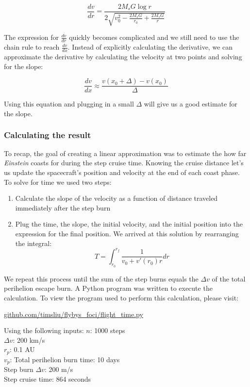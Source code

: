 \documentclass[12pt]{article} %
\begin{document}
$$\frac{dv}{dr} = \frac{2M_sG \log{r}}{2 \sqrt{v_0^2-\frac{2M_sG}{r_0} + \frac{2M_sG}{r}}}$$

The expression for $\frac{dv}{dr}$ quickly becomes complicated and we still need to use the chain rule to reach $\frac{dv}{dx}$. Instead of explicitly calculating the derivative, we can approximate the derivative by calculating the velocity at two points and solving for the slope:

$$\frac{dv}{dx} \approx \frac{v(x_0 +\Delta) - v(x_0)}{\Delta}$$

Using this equation and plugging in a small $\Delta$ will give us a good estimate for the slope.


\subsubsection{Calculating the result}
To recap, the goal of creating a linear approximation was to estimate the how far \textit{Einstein} coasts for during the step cruise time. Knowing the cruise distance let's us update the spacecraft's position and velocity at the end of each coast phase. To solve for time we used two steps:
\begin{enumerate}
\item Calculate the slope of the velocity as a function of distance traveled immediately after the step burn
\item Plug the time, the slope, the initial velocity, and the initial position into the expression for the final position. We arrived at this solution by rearranging the integral:
$$\boxed{T = \int_{r_0}^{r_f} \frac{1}{v_0+v'(r_0)r} dr}$$
\end{enumerate}

We repeat this process until the sum of the step burns equals the $\Delta v$ of the total perihelion escape burn. A Python program was written to execute the calculation. To view the program used to perform this calculation, please visit:

\url{github.com/timsliu/flybys_foci/flight_time.py}

Using the following inputs:
$n$: 1000 steps\\
$\Delta v$: 200 km/s\\
$r_p$: 0.1 AU\\
$v_p$: 
Total perihelion burn time: 10 days\\
Step burn $\Delta v$: 200 m/s\\
Step cruise time: 864 seconds\\
\end{document}
